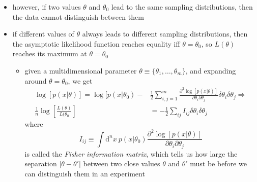 \documentclass[../jaynes_prob_theory_notes.tex]{subfiles}
\begin{document}
\begin{itemize}
\begin{itemize}
                            \item however, if two values $\theta$ and ${\theta}_{0}$ lead to the same sampling distributions, then the data cannot distinguish between them
                            \item if different values of $\theta$ always leads to different sampling distributions, then the asymptotic likelihood function reaches equality iff $\theta = {\theta}_{0}$, so $L(\theta)$ reaches its maximum at $\theta = {\theta}_{0}$
                                \begin{itemize}
                                    \item given a multidimensional parameter $\theta \equiv \{{\theta}_{1}, \ldots, {\theta}_{m}\}$, and expanding around $\theta = {\theta}_{0}$, we get
                                        \begin{align*}
                                            \log [p(x|\theta)] = \log [p(x|{\theta}_{0}) - &\frac{1}{2} \sum\limits^{m}_{i,j=1} \frac{{\partial}^{2} \log[p(x|\theta)]}{\partial {\theta}_{i} \partial {\theta}_{j}} \delta {\theta}_{i} \delta {\theta}_{j} \Rightarrow \\
                                            \frac{1}{n} \log \left[ \frac{L(\theta)}{L({\theta}_{0}} \right] &= -\frac{1}{2} \sum\limits_{ij} I_{ij}\delta {\theta}_{i} \delta {\theta}_{j}
                                        \end{align*}
                                        where 
                                        \begin{equation*}
                                            I_{ij} \equiv \int \mathrm{d}^{n}x~p(x|{\theta}_{0}) \frac{{\partial}^{2} \log[p(x|\theta)]}{\partial {\theta}_{i} \partial {\theta}_{j}}
                                        \end{equation*}
                                        is called the \textit{Fisher information matrix}, which tells us how large the separation $| \theta - {\theta}'|$ between two close values $\theta$ and ${\theta}'$ must be before we can distinguish them in an experiment
                                \end{itemize}
                        \end{itemize}
                \end{itemize}
\end{document}
